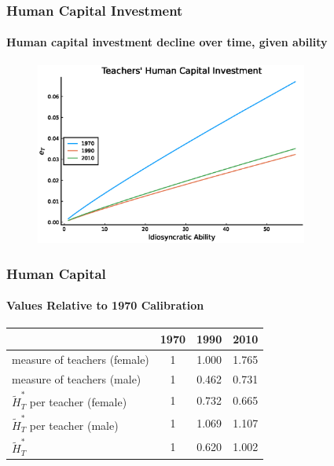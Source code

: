 \documentclass[11pt]{beamer}
\begin{document}
\begin{frame}
\frametitle{Human Capital Investment}
\framesubtitle{Human capital investment decline over time, given ability}
\label{invest}
\begin{figure}
 		\begin{center}
 			\includegraphics[width=0.8\textwidth]{eT_steadystate.eps}
 			\label{ }
 		\end{center}
 	\end{figure}
  \hyperlink{res}{}
\end{frame}

\begin{frame}
\frametitle{Human Capital}
\framesubtitle{Values Relative to 1970 Calibration}
\label{humcap}
\begin{table}
  \centering \begin{tabular}{lccc}
\toprule
& 1970 & 1990 & 2010 \\
\midrule
measure of teachers (female) & 1 & 1.000 & 1.765\\
measure of teachers (male) & 1 & 0.462 & 0.731\\
$\widetilde{H}_T^*$ per teacher (female)   & 1 & 0.732 & 0.665 \\
$\widetilde{H}_T^*$ per teacher (male)   & 1 & 1.069 & 1.107 \\
$\widetilde{H}_T^*$ & 1  & 0.620 & 1.002 \\
\bottomrule
\end{tabular}
\end{table}
 \hyperlink{res}{}
\end{frame}
\end{document}
